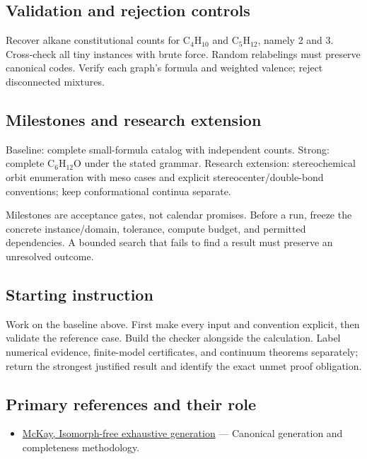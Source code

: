 \documentclass[
  11pt,
]{article}
\providecommand{\tightlist}{%
  \setlength{\itemsep}{0pt}\setlength{\parskip}{0pt}}
\begin{document}
\subsection{Validation and rejection controls}

Recover alkane constitutional counts for
C\ensuremath{{}_{4}}H\ensuremath{{}_{10}} and
C\ensuremath{{}_{5}}H\ensuremath{{}_{12}}, namely 2 and 3. Cross-check
all tiny instances with brute force. Random relabelings must preserve
canonical codes. Verify each graph's formula and weighted valence;
reject disconnected mixtures.

\subsection{Milestones and research extension}

Baseline: complete small-formula catalog with independent counts.
Strong: complete C\ensuremath{{}_{6}}H\ensuremath{{}_{12}}O under the
stated grammar. Research extension: stereochemical orbit enumeration
with meso cases and explicit stereocenter/double-bond conventions; keep
conformational continua separate.

Milestones are acceptance gates, not calendar promises. Before a run,
freeze the concrete instance/domain, tolerance, compute budget, and
permitted dependencies. A bounded search that fails to find a result
must preserve an unresolved outcome.

\subsection{Starting instruction}

Work on the baseline above. First make every input and convention
explicit, then validate the reference case. Build the checker alongside
the calculation. Label numerical evidence, finite-model certificates,
and continuum theorems separately; return the strongest justified result
and identify the exact unmet proof obligation.

\subsection{Primary references and their role}

\begin{itemize}
\tightlist
\item
  \href{https://users.cecs.anu.edu.au/~bdm/papers/orderly.pdf}{McKay,
  Isomorph-free exhaustive generation} --- Canonical generation and
  completeness methodology.
\end{itemize}
\end{document}
